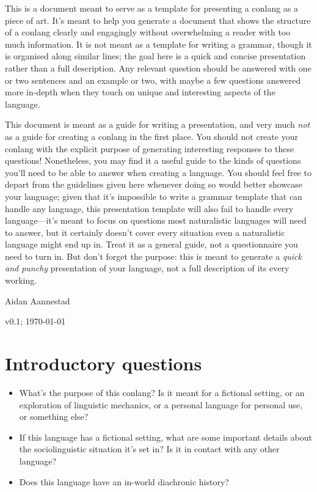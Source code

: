 \documentclass{article}
\begin{document}
This is a document meant to serve as a template for presenting a conlang as a piece of art. It's meant to help you generate a document that shows the structure of a conlang clearly and engagingly without overwhelming a reader with too much information. It is not meant as a template for writing a grammar, though it is organised along similar lines; the goal here is a quick and concise presentation rather than a full description. Any relevant question should be answered with one or two sentences and an example or two, with maybe a few questions answered more in-depth when they touch on unique and interesting aspects of the language.

This document is meant as a guide for writing a presentation, and very much \emph{not} as a guide for creating a conlang in the first place. You should not create your conlang with the explicit purpose of generating interesting responses to these questions! Nonetheless, you may find it a useful guide to the kinds of questions you'll need to be able to answer when creating a language. You should feel free to depart from the guidelines given here whenever doing so would better showcase your language; given that it's impossible to write a grammar template that can handle any language, this presentation template will also fail to handle every language---it's meant to focus on questions most naturalistic languages will need to answer, but it certainly doesn't cover every situation even a naturalistic language might end up in. Treat it as a general guide, not a questionnaire you need to turn in. But don't forget the purpose: this is meant to generate a \emph{quick and punchy} presentation of your language, not a full description of its every working.

\hfill Aidan Aannestad

\hfill v0.1; \today

\newpage

\section{Introductory questions}

\begin{itemize}
  \item What's the purpose of this conlang? Is it meant for a fictional setting, or an exploration of linguistic mechanics, or a personal language for personal use, or something else?
  \item If this language has a fictional setting, what are some important details about the sociolinguistic situation it's set in? Is it in contact with any other language?
  \item Does this language have an in-world diachronic history?
\end{itemize}
\end{document}
